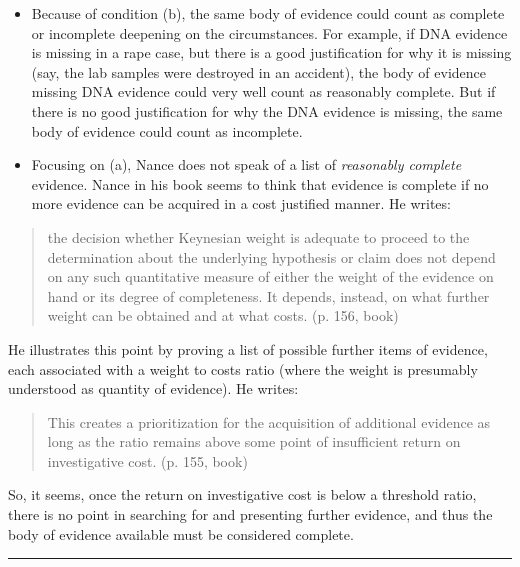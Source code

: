 \documentclass[
  10pt,
  dvipsnames,enabledeprecatedfontcommands]{scrartcl}
\begin{document}
\begin{itemize}
\item
  Because of condition (b), the same body of evidence could count as
  complete or incomplete deepening on the circumstances. For example, if
  DNA evidence is missing in a rape case, but there is a good
  justification for why it is missing (say, the lab samples were
  destroyed in an accident), the body of evidence missing DNA evidence
  could very well count as reasonably complete. But if there is no good
  justification for why the DNA evidence is missing, the same body of
  evidence could count as incomplete.
\item
  Focusing on (a), Nance does not speak of a list of \emph{reasonably
  complete} evidence. Nance in his book seems to think that evidence is
  complete if no more evidence can be acquired in a cost justified
  manner. He writes:
\end{itemize}

\begin{quote}
the decision whether Keynesian weight is adequate to proceed to the determination about the underlying hypothesis or claim does not depend on any such quantitative measure of either the weight of the evidence on hand or its degree of completeness. It depends, instead, on what further weight can be obtained and at what costs. (p. 156, book)
\end{quote}

He illustrates this point by proving a list of possible further items of
evidence, each associated with a weight to costs ratio (where the weight
is presumably understood as quantity of evidence). He writes:

\begin{quote}
This creates a prioritization for the acquisition of additional evidence as long as the ratio remains above some point of insufficient return on investigative cost. (p. 155, book)
\end{quote}

So, it seems, once the return on investigative cost is below a threshold
ratio, there is no point in searching for and presenting further
evidence, and thus the body of evidence available must be considered
complete.

\begin{center}\rule{0.5\linewidth}{0.5pt}\end{center}

\end{document}
